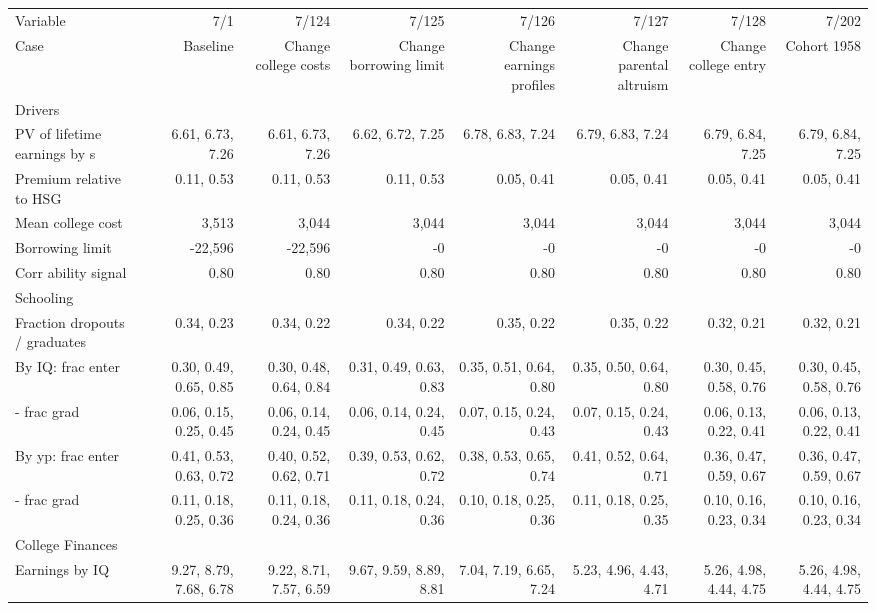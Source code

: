 \begin{tabular}{lrrrrrrr}
\hline
Variable & 7/1  & 7/124  & 7/125  & 7/126  & 7/127  & 7/128  & 7/202  \\ 
Case & Baseline  & Change college costs  & Change borrowing limit  & Change earnings profiles  & Change parental altruism  & Change college entry  & Cohort 1958  \\ 
Drivers &   &   &   &   &   &   &   \\ 
PV of lifetime earnings by s & 6.61, 6.73, 7.26  & 6.61, 6.73, 7.26  & 6.62, 6.72, 7.25  & 6.78, 6.83, 7.24  & 6.79, 6.83, 7.24  & 6.79, 6.84, 7.25  & 6.79, 6.84, 7.25  \\ 
Premium relative to HSG & 0.11, 0.53  & 0.11, 0.53  & 0.11, 0.53  & 0.05, 0.41  & 0.05, 0.41  & 0.05, 0.41  & 0.05, 0.41  \\ 
Mean college cost & 3,513  & 3,044  & 3,044  & 3,044  & 3,044  & 3,044  & 3,044  \\ 
Borrowing limit & -22,596  & -22,596  & -0  & -0  & -0  & -0  & -0  \\ 
Corr ability signal & 0.80  & 0.80  & 0.80  & 0.80  & 0.80  & 0.80  & 0.80  \\ 
\hline
Schooling &   &   &   &   &   &   &   \\ 
Fraction dropouts / graduates & 0.34, 0.23  & 0.34, 0.22  & 0.34, 0.22  & 0.35, 0.22  & 0.35, 0.22  & 0.32, 0.21  & 0.32, 0.21  \\ 
By IQ: frac enter & 0.30, 0.49, 0.65, 0.85  & 0.30, 0.48, 0.64, 0.84  & 0.31, 0.49, 0.63, 0.83  & 0.35, 0.51, 0.64, 0.80  & 0.35, 0.50, 0.64, 0.80  & 0.30, 0.45, 0.58, 0.76  & 0.30, 0.45, 0.58, 0.76  \\ 
- frac grad & 0.06, 0.15, 0.25, 0.45  & 0.06, 0.14, 0.24, 0.45  & 0.06, 0.14, 0.24, 0.45  & 0.07, 0.15, 0.24, 0.43  & 0.07, 0.15, 0.24, 0.43  & 0.06, 0.13, 0.22, 0.41  & 0.06, 0.13, 0.22, 0.41  \\ 
By yp: frac enter & 0.41, 0.53, 0.63, 0.72  & 0.40, 0.52, 0.62, 0.71  & 0.39, 0.53, 0.62, 0.72  & 0.38, 0.53, 0.65, 0.74  & 0.41, 0.52, 0.64, 0.71  & 0.36, 0.47, 0.59, 0.67  & 0.36, 0.47, 0.59, 0.67  \\ 
- frac grad & 0.11, 0.18, 0.25, 0.36  & 0.11, 0.18, 0.24, 0.36  & 0.11, 0.18, 0.24, 0.36  & 0.10, 0.18, 0.25, 0.36  & 0.11, 0.18, 0.25, 0.35  & 0.10, 0.16, 0.23, 0.34  & 0.10, 0.16, 0.23, 0.34  \\ 
\hline
College Finances &   &   &   &   &   &   &   \\ 
Earnings by IQ & 9.27, 8.79, 7.68, 6.78  & 9.22, 8.71, 7.57, 6.59  & 9.67, 9.59, 8.89, 8.81  & 7.04, 7.19, 6.65, 7.24  & 5.23, 4.96, 4.43, 4.71  & 5.26, 4.98, 4.44, 4.75  & 5.26, 4.98, 4.44, 4.75  \\ 

\end{tabular}
